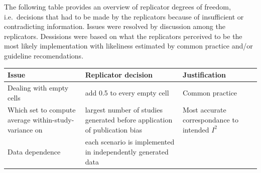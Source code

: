 \documentclass[
  english,
  doc,floatsintext,draftall]{apa6}
\begin{document}
The following table provides an overview of replicator degrees of freedom, i.e.~decisions that had to be made by the replicators because of insufficient or contradicting information.
Issues were resolved by discussion among the replicators.
Dessisions were based on what the replicators perceived to be the most likely implementation with likeliness estimated by common practice and/or guideline recomendations.

\begin{longtable}[]{@{}lll@{}}
\toprule
\begin{minipage}[b]{0.33\columnwidth}\raggedright
Issue\strut
\end{minipage} & \begin{minipage}[b]{0.33\columnwidth}\raggedright
Replicator decision\strut
\end{minipage} & \begin{minipage}[b]{0.25\columnwidth}\raggedright
Justification\strut
\end{minipage}\tabularnewline
\midrule
\endhead
\begin{minipage}[t]{0.33\columnwidth}\raggedright
Dealing with empty cells\strut
\end{minipage} & \begin{minipage}[t]{0.33\columnwidth}\raggedright
add 0.5 to every empty cell\strut
\end{minipage} & \begin{minipage}[t]{0.25\columnwidth}\raggedright
Common practice\strut
\end{minipage}\tabularnewline
\begin{minipage}[t]{0.33\columnwidth}\raggedright
Which set to compute average within-study-variance on\strut
\end{minipage} & \begin{minipage}[t]{0.33\columnwidth}\raggedright
largest number of studies generated before application of publication bias\strut
\end{minipage} & \begin{minipage}[t]{0.25\columnwidth}\raggedright
Most accurate correspondance to intended \(I^2\)\strut
\end{minipage}\tabularnewline
\begin{minipage}[t]{0.33\columnwidth}\raggedright
Data dependence\strut
\end{minipage} & \begin{minipage}[t]{0.33\columnwidth}\raggedright
each scenario is implemented in independently generated data\strut
\end{minipage} & \begin{minipage}[t]{0.25\columnwidth}\raggedright

\end{minipage}
\end{longtable}
\end{document}
